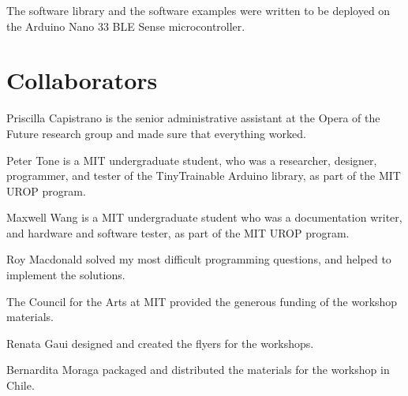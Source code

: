 The software library and the software examples were written to be deployed on the Arduino Nano 33 BLE Sense microcontroller.

\section{Collaborators}

Priscilla Capistrano is the senior administrative assistant at the Opera of the Future research group and made sure that everything worked.

Peter Tone is a MIT undergraduate student, who was a researcher, designer, programmer, and tester of the TinyTrainable Arduino library, as part of the MIT UROP program.

Maxwell Wang is a MIT undergraduate student who was a documentation writer, and hardware and software tester, as part of the MIT UROP program.

Roy Macdonald solved my most difficult programming questions, and helped to implement the solutions.

The Council for the Arts at MIT provided the generous funding of the workshop materials.

Renata Gaui designed and created the flyers for the workshops.

Bernardita Moraga packaged and distributed the materials for the workshop in Chile.

\newpage
